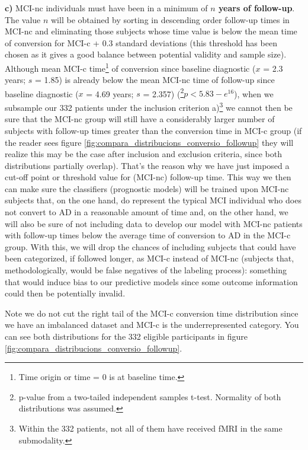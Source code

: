 \documentclass[a4paper,12pt]{elsarticle}  %
\begin{document}
	
	 \textbf{c)}  MCI-nc individuals must have been in a minimum of \textbf{$n$ years of follow-up}. The value $n$ will be obtained by sorting in descending order follow-up times in MCI-nc and eliminating those subjects whose time value is below the mean time of conversion for MCI-c + 0.3 standard deviations (this threshold has been chosen as it gives a good balance between potential validity and sample size). Although mean MCI-c time\footnote{Time origin or time = 0 is at baseline time.} of conversion since baseline diagnostic ($x$ = 2.3 years; $s$ = 1.85) is already below the mean MCI-nc time of follow-up since baseline diagnostic ($x$ = 4.69 years; $s$ = 2.357) (\footnote{p-value from a two-tailed independent samples t-test. Normality of both distributions was assumed.}$p<5.83-e^{16}$), when we subsample our 332 patients under the inclusion criterion a)\footnote{Within the 332 patients, not all of them have received fMRI in the same submodality.} we cannot then be sure that the MCI-nc group will still have a considerably larger number of subjects with follow-up times greater than the conversion time in MCI-c group (if the reader sees figure \ref{fig:compara_distribucions_conversio_followup} they will realize this may be the case after inclusion and exclusion criteria, since both distributions partially overlap). That's the reason why we have just imposed a cut-off point or threshold value for (MCI-nc) follow-up time. This way we then can make sure the classifiers (prognostic models) will be trained upon MCI-nc subjects that, on the one hand, do represent the typical MCI individual who does not convert to AD in a reasonable amount of time and, on the other hand, we will also be sure of not including data to develop our model with MCI-nc patients with follow-up times below the average time of conversion to AD in the MCI-c group. With this, we will drop the chances of including subjects that could have been categorized, if followed longer, as MCI-c instead of MCI-nc (subjects that, methodologically, would be false negatives of the labeling process): something that would induce bias to our predictive models since some outcome information could then be potentially invalid.
	
	Note we do not cut the right tail of the MCI-c conversion time distribution since we have an imbalanced dataset and MCI-c is the underrepresented category. You can see both distributions for the 332 eligible participants in figure \ref{fig:compara_distribucions_conversio_followup}.
	
\end{document}
